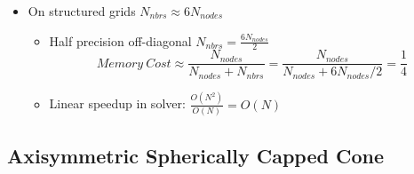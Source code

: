 \documentclass{beamer}
\begin{document}
\begin{frame}
\begin{columns}[t]
  \end{columns}
  \begin{itemize}
    \item On structured grids $N_{nbrs} \approx 6 N_{nodes}$
    \begin{itemize}
      \item Half precision off-diagonal $N_{nbrs} = \frac{6N_{nodes}}{2}$
        \[ 
          Memory\ Cost \approx 
           \frac{N_{nodes}}{N_{nodes} + N_{nbrs}} =
           \frac{N_{nodes}}{N_{nodes} + 6N_{nodes}/2} = \frac{1}{4}
        \]
      \item Linear speedup in solver: $\frac{O(N^2)}{O(N)} = O(N)$
    \end{itemize}
  \end{itemize}
\end{frame}

\subsection{Axisymmetric Spherically Capped Cone}
\end{document}
